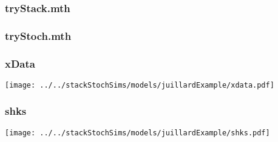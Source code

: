 \documentclass[12pt]{article}
\begin{document}
\subsubsection{tryStack.mth}
\label{sec:trystack.mth}



\subsubsection{tryStoch.mth}
\label{sec:trystack.mth}



\subsubsection{xData}
\label{sec:xdata}

\texttt{[image: ../../stackStochSims/models/juillardExample/xdata.pdf]}

\subsubsection{shks}
\label{sec:xdata}

\texttt{[image: ../../stackStochSims/models/juillardExample/shks.pdf]}
\end{document}
